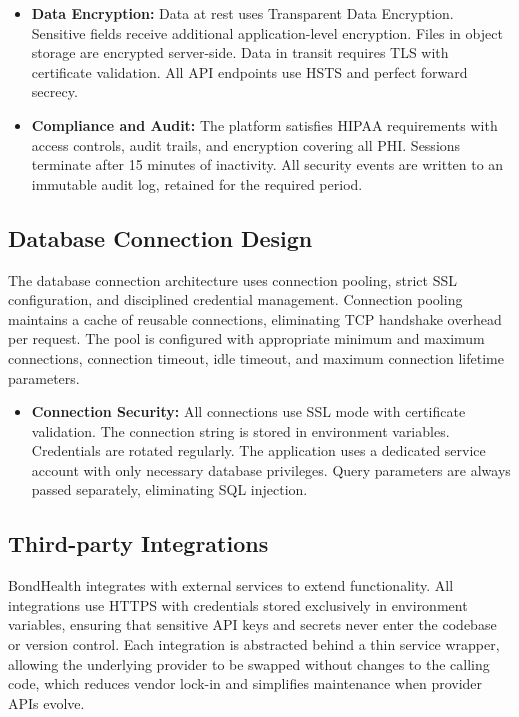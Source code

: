 \begin{itemize}
    \item \textbf{Data Encryption:} Data at rest uses Transparent Data Encryption. Sensitive fields receive additional application-level encryption. Files in object storage are encrypted server-side. Data in transit requires TLS with certificate validation. All API endpoints use HSTS and perfect forward secrecy.

    \item \textbf{Compliance and Audit:} The platform satisfies HIPAA requirements with access controls, audit trails, and encryption covering all PHI. Sessions terminate after 15 minutes of inactivity. All security events are written to an immutable audit log, retained for the required period.
\end{itemize}

\subsection{Database Connection Design}

\justifying
\noindent The database connection architecture uses connection pooling, strict SSL configuration, and disciplined credential management. Connection pooling maintains a cache of reusable connections, eliminating TCP handshake overhead per request. The pool is configured with appropriate minimum and maximum connections, connection timeout, idle timeout, and maximum connection lifetime parameters.

\begin{itemize}
    \item \textbf{Connection Security:} All connections use SSL mode with certificate validation. The connection string is stored in environment variables. Credentials are rotated regularly. The application uses a dedicated service account with only necessary database privileges. Query parameters are always passed separately, eliminating SQL injection.
\end{itemize}

\subsection{Third-party Integrations}

\justifying
\noindent BondHealth integrates with external services to extend functionality. All integrations use HTTPS with credentials stored exclusively in environment variables, ensuring that sensitive API keys and secrets never enter the codebase or version control. Each integration is abstracted behind a thin service wrapper, allowing the underlying provider to be swapped without changes to the calling code, which reduces vendor lock-in and simplifies maintenance when provider APIs evolve.

